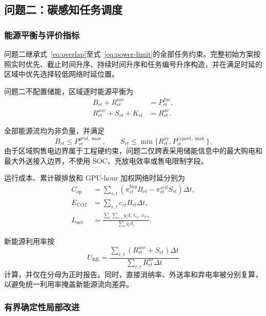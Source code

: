 \subsection{问题二：碳感知任务调度}

\subsubsection{能源平衡与评价指标}

问题二继承式~\eqref{eq:overlap}至式~\eqref{eq:power-limit}的全部任务约束。完整初始方案按照实时优先、截止时间升序、持续时间升序和任务编号升序构造，并在满足时延的区域中优先选择较低网络时延位置。

问题二不配置储能，区域逐时能源平衡为
\begin{align}
B_{rt}+R_{rt}^{use}&=P_{rt}^{fac},\\
R_{rt}^{use}+S_{rt}+K_{rt}&=R_{rt}^{av}.
\label{eq:q2-energy}
\end{align}

全部能源流均为非负量，并满足
\begin{equation}
B_{rt}\le P_{rt}^{grid,\max},
\qquad
S_{rt}\le\min\{R_{rt}^{av},P_{rt}^{export,\max}\}.
\end{equation}
由于区域购售电边界属于工程硬约束，问题二仅跨表采用储能信息中的最大购电和最大外送接入边界，不使用 SOC、充放电效率或售电限制字段。

运行成本、累计碳排放和 GPU-hour 加权网络时延分别为
\begin{align}
C_{\mathrm{op}}
&=\sum_{r,t}
\left(\pi_{rt}^{buy}B_{rt}-\pi_{rt}^{sell}S_{rt}\right)\Delta t,\\
E_{\mathrm{CO2}}
&=\sum_{r,t}c_{rt}B_{rt}\Delta t,\\
L_{\mathrm{net}}
&=\frac{\sum_i\sum_{r,s}g_id_i\ell_{o_ir}x_{irs}}
{\sum_i g_id_i}.
\end{align}

新能源利用率按
\begin{equation}
U_{\mathrm{RE}}=
\frac{\sum_{r,t}(R_{rt}^{use}+S_{rt})\Delta t}
{\sum_{r,t}R_{rt}^{av}\Delta t}
\end{equation}
计算，并仅在分母为正时报告。同时，直接消纳率、外送率和弃电率被分别复算，以避免统一利用率掩盖新能源流向差异。

\subsubsection{有界确定性局部改进}

